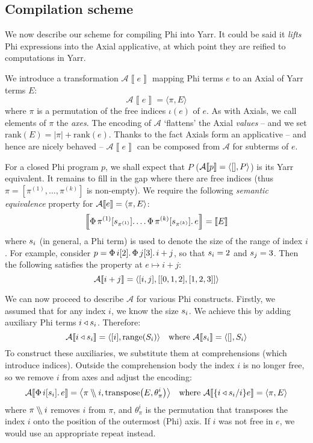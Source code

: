 \needspace{5em}
\subsection{Compilation scheme}

\newcommand{\denot}[1]{\left\llbracket{#1}\right\rrbracket}

We now describe our scheme for compiling Phi into Yarr. It could be said it \textit{lifts} Phi expressions into the Axial applicative, at which point they are reified to computations in Yarr.

We introduce a transformation $\mathcal A \denot{e}$ mapping Phi terms $e$ to an Axial of Yarr terms $E$:
$$ \mathcal A \denot{e} = \langle \pi, E \rangle $$
where $\pi$ is a permutation of the free indices $\iota(e)$ of $e$. As with Axials, we call elements of $\pi$ the \textit{axes}. The encoding of $\mathcal A$ `flattens' the Axial \textit{values} -- and we set $\mathrm{rank}(E) = |\pi| + \mathrm{rank}(e)$. Thanks to the fact Axials form an applicative -- and hence are nicely behaved -- $\mathcal A \denot{e}$ can be composed from $\mathcal A$ for subterms of $e$. 

For a closed Phi program $p$, we shall expect that $P$ ($\mathcal A \denot{p} = \phipair{[]}{P}$) is its Yarr equivalent. It remains to fill in the gap where there are free indices (thus $\pi = \left[ \pi^{(1)}, \dots, \pi^{(k)} \right]$ is non-empty). We require the following \textit{semantic equivalence} property for $\mathcal A \denot e = \phipair{\pi}{E}$:
$$ \denot{\phivec{\pi^{(1)}}{\sizeat{\pi^{(1)}}}{\dots \phivec{\pi^{(k)}}{\sizeat{\pi^{(k)}}}{e}}} = \denot{E}$$
where $s_{i}$ (in general, a Phi term) is used to denote the size of the range of index $i$. For example, consider $p = \Phi\, {i}[{2}] \ldotp {\Phi\, {j}[{3}] \ldotp {i + j}}$, so that $s_{i} = 2$ and $s_{j} = 3$. Then the following satisfies the property at $e \mapsto i + j$:
$$ \mathcal A \denot{i + j} = \phipair{[i, j]}{[[0, 1, 2], [1, 2, 3]]} $$

\newcommand{\sized}[1]{{#1} \triangleleft \sizeat{#1}}
We can now proceed to describe $\mathcal A$ for various Phi constructs. Firstly, we assumed that for any index $i$, we know the size $s_{i}$. We achieve this by adding auxiliary Phi terms $\sized i$. Therefore:
$$ \mathcal A \denot{i \triangleleft \sizeat{i}} 
= \phipair{[i]}{ \mathrm{range} \left( \altsizeat{i} \right) }
\quad 
\text{where } \mathcal A \denot{\sizeat{i}} = \phipair{[]}{\altsizeat{i}} $$
To construct these auxiliaries, we substitute them at comprehensions (which introduce indices). Outside the comprehension body the index $i$ is no longer free, so we  remove $i$ from axes and adjust the encoding:
\newcommand{\dblsetminus}{\mathbin{{\setminus}\mspace{-5mu}{\setminus}}}
$$
\mathcal A \denot{\phivec{i}{\sizeat i}{e}} 
= \phipair{\mathcal \pi \dblsetminus i}{
\mathrm{transpose} \left( E, \theta_\pi^i \right)} 
\quad
\text{where } \mathcal A \denot{\{\sized i / i\} e} 
= \phipair{\pi}{E}
$$
where $\pi \dblsetminus i$ removes $i$ from $\pi$, and $\theta_\pi^i$ is the permutation that transposes the index $i$ onto the position of the outermost (Phi) axis. 
If $i$ was not free in $e$, we would use an appropriate $\mathrm{repeat}$ instead.

